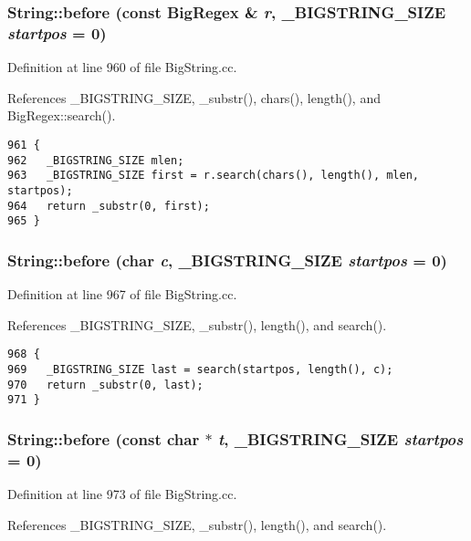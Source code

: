 \subsubsection{ String::before (const {\bf Big\-Regex} \& {\em r}, {\bf \_\-BIGSTRING\_\-SIZE} {\em startpos} = 0)}\label{classString_a63}




Definition at line 960 of file Big\-String.cc.

References \_\-BIGSTRING\_\-SIZE, \_\-substr(), chars(), length(), and Big\-Regex::search().



\footnotesize\begin{verbatim}961 {
962   _BIGSTRING_SIZE mlen;
963   _BIGSTRING_SIZE first = r.search(chars(), length(), mlen, startpos);
964   return _substr(0, first);
965 }
\end{verbatim}\normalsize 
{}
\subsubsection{ String::before (char {\em c}, {\bf \_\-BIGSTRING\_\-SIZE} {\em startpos} = 0)}\label{classString_a62}




Definition at line 967 of file Big\-String.cc.

References \_\-BIGSTRING\_\-SIZE, \_\-substr(), length(), and search().



\footnotesize\begin{verbatim}968 {
969   _BIGSTRING_SIZE last = search(startpos, length(), c);
970   return _substr(0, last);
971 }
\end{verbatim}\normalsize 
{}
\subsubsection{ String::before (const char $\ast$ {\em t}, {\bf \_\-BIGSTRING\_\-SIZE} {\em startpos} = 0)}\label{classString_a61}




Definition at line 973 of file Big\-String.cc.

References \_\-BIGSTRING\_\-SIZE, \_\-substr(), length(), and search().



